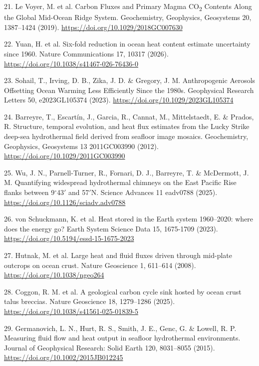 \documentclass[11pt,a4paper]{article}
\begin{document}
{\small 21. Le Voyer, M. et al. Carbon Fluxes and Primary Magma CO\textsubscript{2} Contents Along the Global Mid-Ocean Ridge System. Geochemistry, Geophysics, Geosystems 20, 1387--1424 (2019). \url{https://doi.org/10.1029/2018GC007630}\par}
{\small 22. Yuan, H. et al. Six-fold reduction in ocean heat content estimate uncertainty since 1960. Nature Communications 17, 10317 (2026). \url{https://doi.org/10.1038/s41467-026-76436-0}\par}
{\small 23. Sohail, T., Irving, D. B., Zika, J. D. \& Gregory, J. M. Anthropogenic Aerosols Offsetting Ocean Warming Less Efficiently Since the 1980s. Geophysical Research Letters 50, e2023GL105374 (2023). \url{https://doi.org/10.1029/2023GL105374}\par}
{\small 24. Barreyre, T., Escart\'{i}n, J., Garcia, R., Cannat, M., Mittelstaedt, E. \& Prados, R. Structure, temporal evolution, and heat flux estimates from the Lucky Strike deep-sea hydrothermal field derived from seafloor image mosaics. Geochemistry, Geophysics, Geosystems 13 2011GC003990 (2012). \url{https://doi.org/10.1029/2011GC003990}\par}
{\small 25. Wu, J. N., Parnell-Turner, R., Fornari, D. J., Barreyre, T. \& McDermott, J. M. Quantifying widespread hydrothermal chimneys on the East Pacific Rise flanks between 9\ensuremath{^\circ}43\ensuremath{\prime} and 57\ensuremath{\prime}N. Science Advances 11 eadv0788 (2025). \url{https://doi.org/10.1126/sciadv.adv0788}\par}
{\small 26. von Schuckmann, K. et al. Heat stored in the Earth system 1960--2020: where does the energy go? Earth System Science Data 15, 1675-1709 (2023). \url{https://doi.org/10.5194/essd-15-1675-2023}\par}
{\small 27. Hutnak, M. et al. Large heat and fluid fluxes driven through mid-plate outcrops on ocean crust. Nature Geoscience 1, 611--614 (2008). \url{https://doi.org/10.1038/ngeo264}\par}
{\small 28. Coggon, R. M. et al. A geological carbon cycle sink hosted by ocean crust talus breccias. Nature Geoscience 18, 1279--1286 (2025). \url{https://doi.org/10.1038/s41561-025-01839-5}\par}
{\small 29. Germanovich, L. N., Hurt, R. S., Smith, J. E., Genc, G. \& Lowell, R. P. Measuring fluid flow and heat output in seafloor hydrothermal environments. Journal of Geophysical Research: Solid Earth 120, 8031--8055 (2015). \url{https://doi.org/10.1002/2015JB012245}\par}
\clearpage
\end{document}
